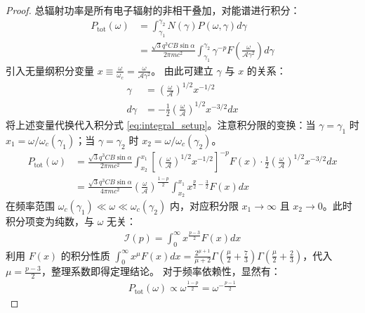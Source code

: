 \documentclass[12pt,oneside]{ctexart}
\theoremstyle{definition}
\theoremstyle{plain}
\theoremstyle{remark}
\begin{document}
\begin{proof}
    总辐射功率是所有电子辐射的非相干叠加，对能谱进行积分：
    \begin{align}
        P_{\text{tot}}(\omega) &= \int_{\gamma_1}^{\gamma_2} N(\gamma) P(\omega, \gamma) d\gamma \nonumber \\
        &= \frac{\sqrt{3} q^3 C B \sin\alpha}{2\pi m c^2} \int_{\gamma_1}^{\gamma_2} \gamma^{-p} F\left( \frac{\omega}{\mathcal{A} \gamma^2} \right) d\gamma \label{eq:integral_setup}
    \end{align}
    引入无量纲积分变量 $x \equiv \frac{\omega}{\omega_c} = \frac{\omega}{\mathcal{A} \gamma^2}$。
    由此可建立 $\gamma$ 与 $x$ 的关系：
    \begin{align}
        \gamma &= \left( \frac{\omega}{\mathcal{A}} \right)^{1/2} x^{-1/2} \\
        d\gamma &= -\frac{1}{2} \left( \frac{\omega}{\mathcal{A}} \right)^{1/2} x^{-3/2} dx
    \end{align}
    将上述变量代换代入积分式 \eqref{eq:integral_setup}。注意积分限的变换：当 $\gamma = \gamma_1$ 时 $x_1 = \omega/\omega_c(\gamma_1)$；当 $\gamma = \gamma_2$ 时 $x_2 = \omega/\omega_c(\gamma_2)$。
    \begin{align}
        P_{\text{tot}}(\omega) &= \frac{\sqrt{3} q^3 C B \sin\alpha}{2\pi m c^2} \int_{x_2}^{x_1} \left[ \left( \frac{\omega}{\mathcal{A}} \right)^{1/2} x^{-1/2} \right]^{-p} F(x) \cdot \frac{1}{2} \left( \frac{\omega}{\mathcal{A}} \right)^{1/2} x^{-3/2} dx \nonumber \\
        &= \frac{\sqrt{3} q^3 C B \sin\alpha}{4\pi m c^2} \left( \frac{\omega}{\mathcal{A}} \right)^{\frac{1-p}{2}} \int_{x_2}^{x_1} x^{\frac{p}{2} - \frac{3}{2}} F(x) dx \label{eq:integral_x}
    \end{align}
    在频率范围 $\omega_c(\gamma_1) \ll \omega \ll \omega_c(\gamma_2)$ 内，对应积分限 $x_1 \to \infty$ 且 $x_2 \to 0$。此时积分项变为纯数，与 $\omega$ 无关：
    \begin{align}
        \mathcal{I}(p) = \int_0^{\infty} x^{\frac{p-3}{2}} F(x) dx
    \end{align}
    利用 $F(x)$ 的积分性质 $\int_0^\infty x^\mu F(x) dx = \frac{2^{\mu+1}}{\mu+2} \Gamma(\frac{\mu}{2} + \frac{7}{3}) \Gamma(\frac{\mu}{2} + \frac{2}{3})$，代入 $\mu = \frac{p-3}{2}$，整理系数即得定理结论。
    对于频率依赖性，显然有：
    \begin{align}
        P_{\text{tot}}(\omega) \propto \omega^{\frac{1-p}{2}} = \omega^{-\frac{p-1}{2}}
    \end{align}
\end{proof}
\end{document}
